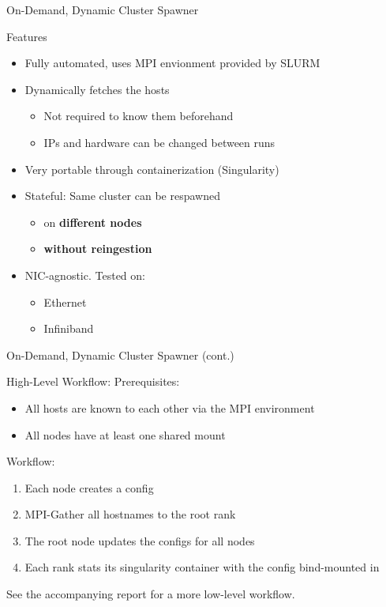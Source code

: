 \documentclass[compress,aspectratio=169]{beamer}
\begin{document}
	\begin{frame}{On-Demand, Dynamic Cluster Spawner}
    \begin{block}{Features}
      \pause
      \begin{itemize}
        \item Fully automated, uses MPI envionment provided by SLURM
          \pause
        \item Dynamically fetches the hosts
          \begin{itemize}
            \item Not required to know them beforehand
            \item IPs and hardware can be changed between runs
          \end{itemize}
          \pause
        \item Very portable through containerization (Singularity)
          \pause
        \item Stateful: Same cluster can be respawned 
          \begin{itemize}
            \item on \textbf{different nodes}
            \item \textbf{without reingestion}
          \end{itemize}
          \pause
        \item NIC-agnostic. Tested on:
          \begin{itemize}
            \item Ethernet
            \item Infiniband
          \end{itemize}
      \end{itemize}
    \end{block}
	\end{frame}

  \begin{frame}{On-Demand, Dynamic Cluster Spawner (cont.)}
    \begin{block}{High-Level Workflow: }
      Prerequisites:
      \begin{itemize}
        \item All hosts are known to each other via the MPI environment
        \item All nodes have at least one shared mount
      \end{itemize}
      \pause
      Workflow:
      \begin{enumerate}
        \item Each node creates a config
          \pause
        \item MPI-Gather all hostnames to the root rank
          \pause
        \item The root node updates the configs for all nodes
          \pause
        \item Each rank stats its singularity container with the config bind-mounted in
      \end{enumerate}
    \end{block}
    \pause
    \begin{center}
      See the accompanying report for a more low-level workflow.
    \end{center}
	\end{frame}
\end{document}
